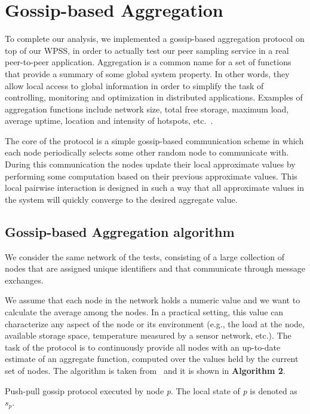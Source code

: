 
\chapter{Gossip-based Aggregation}
\label{cha:aggregation}
To complete our analysis, we implemented a gossip-based aggregation protocol on top of our \ac{WPSS}, in order to actually test our peer sampling service in a real peer-to-peer application. Aggregation is a common name for a set of functions that provide a summary of some global system property. In other words, they allow local access to global information in order to simplify the task of controlling, monitoring and optimization in distributed applications. Examples of aggregation functions include network size, total free storage, maximum load, average uptime, location and intensity of hotspots, etc.~\cite{aggregation}. 

The core of the protocol is a simple gossip-based communication scheme in which each node periodically selects some other random node to communicate with. During this communication the nodes update their local approximate values by performing some computation based on their previous approximate values. This local pairwise interaction is designed in such a way that all approximate values in the system will quickly converge to the desired aggregate value. 

\section{Gossip-based Aggregation algorithm}
We consider the same network of the tests, consisting of a large collection of nodes that are assigned unique identifiers and that communicate through message exchanges. 

We assume that each node in the network holds a numeric value and we want to calculate the average among the nodes. In a practical setting, this value can characterize any aspect of the node or its environment (e.g., the load at the node, available storage space, temperature measured by a sensor network, etc.). The task of the protocol is to continuously provide all nodes with an up-to-date estimate of an aggregate function, computed over the values held by the current set of nodes. The algorithm is taken from~\cite{aggregation} and it is shown in \textbf{Algorithm 2}.

\begin{algorithm}[H]




 \caption{Push-pull gossip protocol executed by node \textit{p}. The local state of \textit{p} is denoted as $s_p$.}
\end{algorithm}

